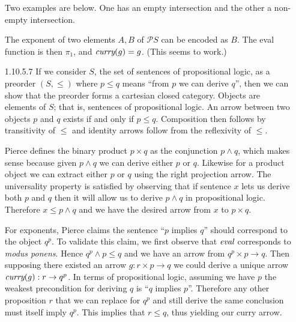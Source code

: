 \documentclass{article}
\newcommand{\curry}[1]{\emph{curry}(#1)}
\newcommand{\eval}{\emph{eval}}
\newcommand{\id}{\emph{id}}
\newcommand{\powset}{\mathcal{P}}
\newcommand{\set}[1]{\{#1\}}
\begin{document}
\begin{enumerate}
  Two examples are below.
  One has an empty intersection and the other a non-empty intersection.
  \begin{center}
  \end{center}

  The exponent of two elements $A,B$ of $\powset{S}$ can be encoded as $B$.
  The eval function is then $\pi_1$, and $\curry{g} = g$.
  (This seems to work.)

\item [1.10.5.7]
  If we consider $S$, the set of sentences of propositional logic, as a preorder $(S, \le)$ where $p \le q$ means ``from $p$ we can derive $q$'', then we can show that the preorder forms a cartesian closed category.
  Objects are elements of $S$; that is, sentences of propositional logic.
  An arrow between two objects $p$ and $q$ exists if and only if $p \le q$.
  Composition then follows by transitivity of $\le$ and identity arrows follow from the reflexivity of $\le$.

  Pierce defines the binary product $p \times q$ as the conjunction $p \wedge q$, which makes sense because given $p \wedge q$ we can derive either $p$ or $q$.
  Likewise for a product object we can extract either $p$ or $q$ using the right projection arrow.
  The universality property is satisfied by observing that if sentence $x$ lets us derive both $p$ and $q$ then it will allow us to derive $p \wedge q$ in propositional logic.
  Therefore $x \le p \wedge q$ and we have the desired arrow from $x$ to $p \times q$.

  For exponents, Pierce claims the sentence ``$p$ implies $q$'' should correspond to the object $q^p$.
  To validate this claim, we first observe that $\eval$ corresponds to \emph{modus ponens}.
  Hence $q^p \wedge p \le q$ and we have an arrow from $q^p \times p \rightarrow q$.
  Then supposing there existed an arrow $g : r \times p \rightarrow q$ we could derive a unique arrow $\curry{g} : r \rightarrow q^p$.
  In terms of propositional logic, assuming we have $p$ the weakest precondition for deriving $q$ is ``$q$ implies $p$''.
  Therefore any other proposition $r$ that we can replace for $q^p$ and still derive the same conclusion must itself imply $q^p$.
  This implies that $r \le q$, thus yielding our curry arrow.
  

\end{enumerate}
\end{document}
